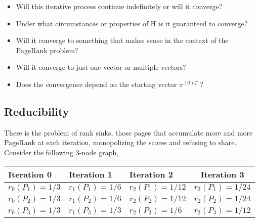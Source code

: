 \begin{itemize}
	\item Will this iterative process continue indefinitely or will it converge?
	\item Under what circumstances or properties of H is it guaranteed to converge?
	\item Will it converge to something that makes sense in the context of the PageRank problem?
	\item Will it converge to just one vector or multiple vectors?
	\item Does the convergence depend on the starting vector $\pi^{(0)T}$ ?
\end{itemize}
	
\subsection{Reducibility}
	
There is the problem of rank sinks, those pages that accumulate more and more PageRank at each iteration, monopolizing the scores and refusing to share. Consider the following 3-node graph,

\begin{center}
\end{center}

\begin{table}[h]
	\centering
	\begin{tabular}{l l l c}
		\toprule
		\textbf{Iteration 0} & \textbf{Iteration 1} & \textbf{Iteration 2} & \textbf{Iteration 3}\\
		\midrule
		$r_{0}\left(P_{1}\right)=1 / 3$ & $r_{1}\left(P_{1}\right)=1 / 6$ & $r_{2}\left(P_{1}\right)=1 / 12$ & 
		$r_{2}\left(P_{1}\right)=1 / 24$\\
		$r_{0}\left(P_{2}\right)=1 / 3$ & $r_{1}\left(P_{2}\right)=1 / 6$ & $r_{2}\left(P_{2}\right)=1 / 12$ & 
		$r_{2}\left(P_{2}\right)=1 / 24$\\
		$r_{0}\left(P_{3}\right)=1 / 3$ & $r_{1}\left(P_{3}\right)=1 / 3$ & $r_{2}\left(P_{3}\right)=1 / 6$ & 
		$r_{2}\left(P_{3}\right)=1 / 12$\\
		\bottomrule
	\end{tabular}	
\end{table}

